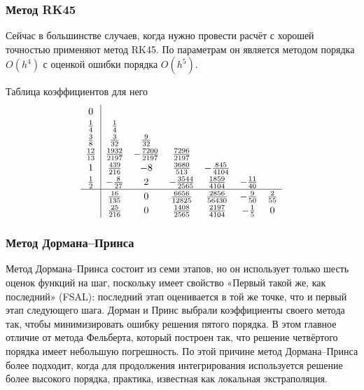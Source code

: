 \documentclass[a4paper,12pt]{article}
\begin{document}
	\subsubsection{Метод RK45}

	Сейчас в большинстве случаев, когда нужно провести расчёт с хорошей точностью применяют метод RK45. По параметрам он является методом порядка \(O(h^4)\) с оценкой ошибки порядка  \(O(h^5)\).

	Таблица коэффициентов для него
	 \begin{equation*}
	 \renewcommand\arraystretch{1.2}
	 \begin{array}
	 	{c|ccccccc}
	 	0\\
	 	\frac{1}{4} & \frac{1}{4}\\
	 	\frac{3}{8} &\frac{3}{32} &\frac{9}{32} \\
		\frac{12}{13} &\frac{1932}{2197} &-\frac{7200}{2197} &\frac{7296}{2197} \\
		1 &\frac{439}{216} &-8 &\frac{3680}{513} &-\frac{845}{4104} \\
		\frac{1}{2}&-\frac{8}{27} &2 &-\frac{3544}{2565} &\frac{1859}{4104} &-\frac{11}{40} \\
	 	\hline
	 	& \frac{16}{135} &0 &\frac{6656}{12825} &\frac{2856}{56430} &-\frac{9}{50} &\frac{2}{55}\\
		& \frac{25}{216} &0 &\frac{1408}{2565} &\frac{2197}{4104} &-\frac{1}{5} &0
	 \end{array}
	 \end{equation*}

	\subsubsection{Метод Дормана--Принса}

	Метод Дормана--Принса состоит из семи этапов, но он использует только шесть оценок функций на шаг, поскольку имеет свойство «Первый такой же, как последний» (FSAL): последний этап оценивается в той же точке, что и первый этап следующего шага. Дорман и Принс выбрали коэффициенты своего метода так, чтобы минимизировать ошибку решения пятого порядка. В этом главное отличие от метода Фельберта, который построен так, что решение четвёртого порядка имеет небольшую погрешность. По этой причине метод Дормана--Принса более подходит, когда для продолжения интегрирования используется решение более высокого порядка, практика, известная как локальная экстраполяция.
\end{document}
